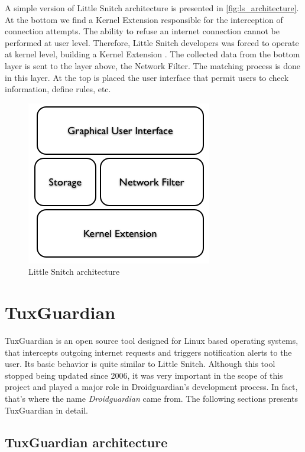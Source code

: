 A simple version of Little Snitch architecture is presented in \autoref{fig:ls_architecture}. At the bottom we find a Kernel Extension responsible for the interception of connection attempts. The ability to refuse an internet connection cannot be performed at user level. Therefore, Little Snitch developers was forced to operate at kernel level, building a Kernel Extension \cite{Documentation:LittleSnitch}. The collected data from the bottom layer is sent to the layer above, the Network Filter. The matching process is done in this layer. At the top is placed the user interface that permit users to check information, define rules, etc.

\begin{figure}[htbp]
 \centering
 \includegraphics[scale=0.5]{figures/ls_arch.png}
 \caption{Little Snitch architecture}
 \label{fig:ls_architecture}
\end{figure}



\section{TuxGuardian}
\label{sec:tuxguardian}

TuxGuardian \cite{Page:TuxGuardian} is an open source tool designed for Linux based operating systems, that intercepts outgoing internet requests and triggers notification alerts to the user. Its basic behavior is quite similar to Little Snitch. Although this tool stopped being updated since 2006, it was very important in the scope of this project and played a major role in Droidguardian's development process. In fact, that's where the name \textit{Droidguardian} came from. The following sections presents TuxGuardian in detail.

\subsection{TuxGuardian architecture}

